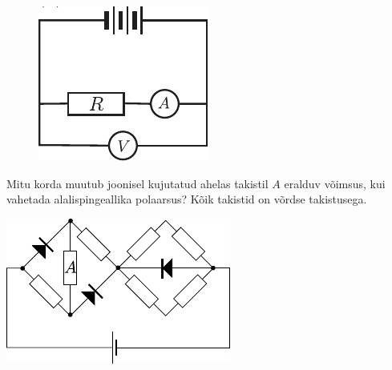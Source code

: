 \documentclass[10pt]{article}
\begin{document}
{\begin{figure}[h]
\begin{minipage}[b]{0.3\textwidth}
		\includegraphics[width=\linewidth]{2005-v2g-04-yl2}
    \end{minipage}
\end{figure}
\probend
\bigskip


Mitu korda muutub joonisel kujutatud ahelas takistil $A$ eralduv võimsus, kui vahetada alalispingeallika polaarsus? Kõik takistid on võrdse takistusega.

\begin{center}
	\includegraphics[width=0.6\linewidth]{2005-v3g-04-yl}
\end{center}
\probend
\bigskip


}
\end{document}
